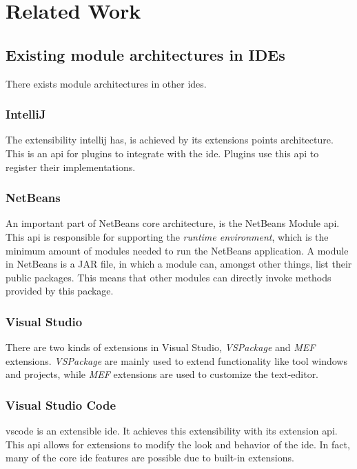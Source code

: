 \chapter{Related Work} \label{cha:related}

\section{Existing module architectures in IDEs}

There exists module architectures in other \gls*{ide}s.

\subsection{IntelliJ}

The extensibility \gls*{intellij} has, is achieved by its extensions points
architecture. This is an \gls*{api} for plugins to integrate with the
\gls*{ide}. Plugins use this \gls*{api} to register their implementations.

\subsection{NetBeans}

An important part of NetBeans core architecture, is the NetBeans Module
\gls*{api}. This \gls{api} is responsible for supporting the
\textit{runtime environment}, which is the minimum amount of modules needed to
run the NetBeans application. A module in NetBeans is a JAR file, in which a
module can, amongst other things, list their public packages. This means that
other modules can directly invoke methods provided by this package.

\subsection{Visual Studio}

There are two kinds of extensions in Visual Studio, \textit{VSPackage} and
\textit{MEF} extensions. \textit{VSPackage} are mainly used to extend
functionality like tool windows and projects, while \textit{MEF} extensions are
used to customize the text-editor.

\subsection{Visual Studio Code}

\gls*{vscode} is an extensible \gls*{ide}. It achieves this extensibility with
its extension \gls*{api}. This \gls*{api} allows for extensions to modify the
look and behavior of the \gls*{ide}. In fact, many of the core \gls*{ide}
features are possible due to built-in extensions.


